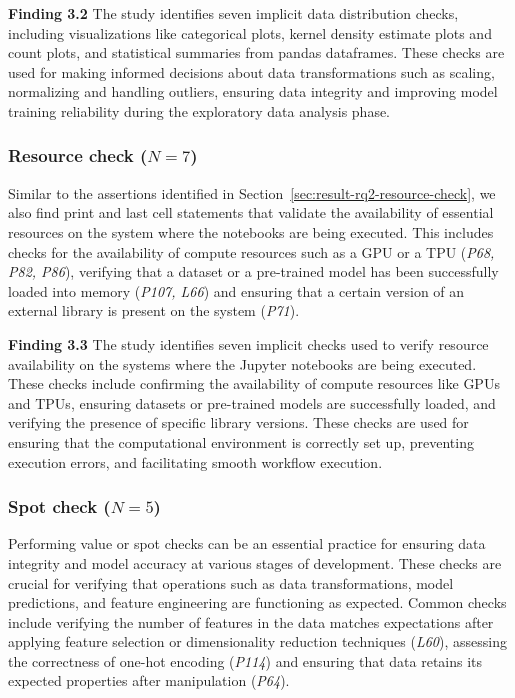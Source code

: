 \documentclass[smallextended]{svjour3}       %
\newcommand{\highlight}[1]{\begin{framed}%
  \noindent#1
\end{framed}}
\begin{document}
\highlight{\textbf{Finding 3.2} The study identifies seven implicit data distribution checks, including visualizations like categorical plots, kernel density estimate plots and count plots, and statistical summaries from pandas dataframes. These checks are used for making informed decisions about data transformations such as scaling, normalizing and handling outliers, ensuring data integrity and improving model training reliability during the exploratory data analysis phase.}

\subsubsection{Resource check ($N = 7$)}\label{sec:implicit-resource-check}

Similar to the assertions identified in Section~\ref{sec:result-rq2-resource-check}, we also find print and last cell statements that validate the availability of essential resources on the system where the notebooks are being executed. This includes checks for the availability of compute resources such as a GPU or a TPU (\emph{P68, P82, P86}), verifying that a dataset or a pre-trained model has been successfully loaded into memory (\emph{P107, L66}) and ensuring that a certain version of an external library is present on the system (\emph{P71}).

\highlight{\textbf{Finding 3.3} The study identifies seven implicit checks used to verify resource availability on the systems where the Jupyter notebooks are being executed. These checks include confirming the availability of compute resources like GPUs and TPUs, ensuring datasets or pre-trained models are successfully loaded, and verifying the presence of specific library versions. These checks are used for ensuring that the computational environment is correctly set up, preventing execution errors, and facilitating smooth workflow execution.}

\subsubsection{Spot check ($N = 5$)}

Performing value or spot checks can be an essential practice for ensuring data integrity and model accuracy at various stages of development. These checks are crucial for verifying that operations such as data transformations, model predictions, and feature engineering are functioning as expected. Common checks include verifying the number of features in the data matches expectations after applying feature selection or dimensionality reduction techniques (\emph{L60}), assessing the correctness of one-hot encoding (\emph{P114}) and ensuring that data retains its expected properties after manipulation (\emph{P64}).
\end{document}
